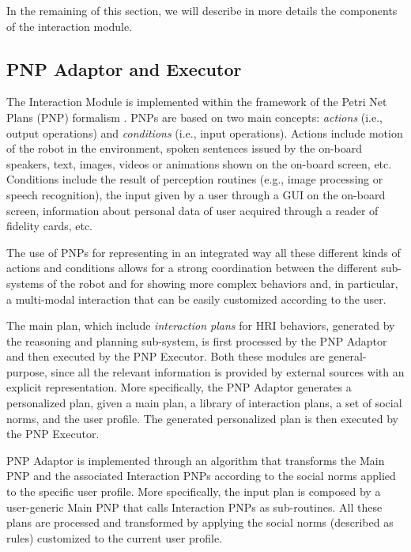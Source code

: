 In the remaining of this section, we will describe in more details the components of the interaction module.

\subsection{PNP Adaptor and Executor}

The Interaction Module is implemented within the framework of the Petri Net Plans (PNP) formalism \cite{ZiIo11PNP}. PNPs are based on two main concepts: \emph{actions} (i.e., output operations) and \emph{conditions} (i.e., input operations). Actions include motion of the robot in the environment, spoken sentences issued by the on-board speakers, text, images, videos or animations shown on the on-board screen, etc.
Conditions include the result of perception routines (e.g., image processing or speech recognition), the input given by a user through a GUI on the on-board screen, information about personal data of user acquired through a reader of fidelity cards, etc.

The use of PNPs for representing in an integrated way all these different kinds of actions and conditions allows for a strong coordination between the different sub-systems of the robot and for showing more complex behaviors and, in particular, a multi-modal interaction that can be easily customized according to the user.


The main plan, which include \emph{interaction plans} for HRI behaviors, generated by the reasoning and planning sub-system, is first processed by the PNP Adaptor and then executed by the PNP Executor. Both these modules are general-purpose, since all the relevant information is provided by external sources with an explicit representation. More specifically, the PNP Adaptor generates a personalized plan, given a main plan, a library of interaction plans, a set of social norms, and the user profile. The generated personalized plan is then executed by the PNP Executor. 

PNP Adaptor is implemented through an algorithm that transforms the Main PNP and the associated Interaction PNPs according to the social norms applied to the specific user profile. More specifically, the input plan is composed by a user-generic Main PNP that calls Interaction PNPs as sub-routines. All these plans are processed and transformed by applying the social norms (described as rules) customized to the current user profile.

